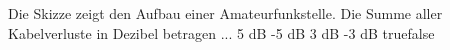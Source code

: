     {Die Skizze zeigt den Aufbau einer Amateurfunkstelle. Die Summe aller Kabelverluste in Dezibel betragen ...}
    {5 dB}
    {-5 dB}
    {3 dB}
    {-3 dB}
    {true}{false}